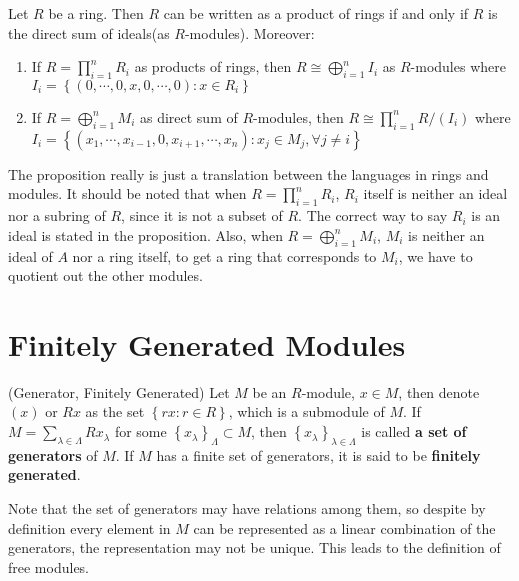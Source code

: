 \documentclass{note-eng}
\begin{document}
\begin{proposition}
    Let $R$ be a ring. Then $R$ can be written as a product of rings if and only if $R$ is the direct sum of ideals(as $R$-modules). Moreover:
    \begin{enumerate}
        \item If $R = \prod\limits_{i = 1}^{n} R_i$ as products of rings, then $R \cong \bigoplus\limits_{i = 1}^n I_i$ as $R$-modules where $I_i = \left\lbrace (0, \cdots, 0, x, 0, \cdots, 0): x \in R_i \right\rbrace$
        \item If $R = \bigoplus\limits_{i = 1}^{n} M_i$ as direct sum of $R$-modules, then $R \cong \prod\limits_{i = 1}^{n} R / (I_i)$ where $I_i = \left\lbrace (x_1, \cdots, x_{i - 1}, 0, x_{i + 1}, \cdots, x_n): x_j \in M_j, \forall j \ne i \right\rbrace$
    \end{enumerate}
\end{proposition}

The proposition really is just a translation between the languages in rings and modules. It should be noted that when $R = \prod\limits_{i = 1}^{n} R_i$, $R_i$ itself is neither an ideal nor a subring of $R$, since it is not a subset of $R$. The correct way to say $R_i$ is an ideal is stated in the proposition. Also, when $R = \bigoplus\limits_{i = 1}^nM_i$, $M_i$ is neither an ideal of $A$ nor a ring itself, to get a ring that corresponds to $M_i$, we have to quotient out the other modules.

\section{Finitely Generated Modules}

\begin{definition}
    (Generator, Finitely Generated) Let $M$ be an $R$-module, $x \in M$, then denote $(x)$ or $Rx$ as the set $\left\lbrace rx: r \in R \right\rbrace$, which is a submodule of $M$. If $M = \sum\limits_{\lambda \in \Lambda} Rx_{\lambda}$ for some $\left\lbrace x_{\lambda} \right\rbrace_{\Lambda} \subset M$, then $\left\lbrace x_{\lambda} \right\rbrace_{\lambda \in \Lambda}$ is called \textbf{a set of generators} of $M$. If $M$ has a finite set of generators, it is said to be \textbf{finitely generated}.
\end{definition}

Note that the set of generators may have relations among them, so despite by definition every element in $M$ can be represented as a linear combination of the generators, the representation may not be unique. This leads to the definition of free modules.
\end{document}
